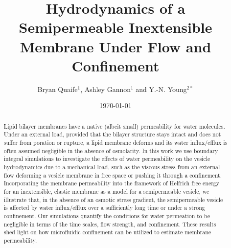 \documentclass[prb,preprint,showpacs,preprintnumbers,amsmath,amssymb,longbibliography]{revtex4-1}
\begin{document}
\title{Hydrodynamics of a  Semipermeable Inextensible Membrane Under Flow and
Confinement}

\author{Bryan Quaife$^{1}$, Ashley Gannon$^{1}$ and Y.-N. Young$^{2*}$}

\date{\today}


\begin{abstract}
Lipid bilayer membranes have a native (albeit small) permeability for
water molecules. Under an external load, 
provided that the bilayer structure stays intact and does
not suffer from poration or rupture,
a lipid membrane deforms and
its water influx/efflux is often assumed negligible in the absence of
osmolarity. 
%
In this work we use boundary integral simulations to investigate the
effects of water permeability on the vesicle hydrodynamics due to
a mechanical load, such as the viscous stress from an external flow
deforming a vesicle membrane in free space or pushing it through a
confinement. Incorporating the membrane permeability into the framework of Helfrich free energy for an inextensible, elastic membrane as a model for a semipermeable vesicle, we
illustrate that, in the absence of an osmotic stress gradient, the
semipermeable vesicle is affected by water influx/efflux over a
sufficiently long time or under a strong confinement. Our simulations
quantify the conditions for water permeation to be negligible in terms
of the time scales, flow strength, and confinement. These results shed
light on how microfluidic confinement can be utilized to estimate
membrane permeability.
\end{abstract}

                              
                              
\maketitle
\end{document}
